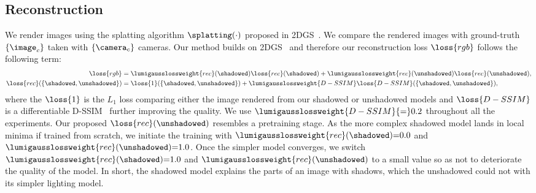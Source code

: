   \subsection{Reconstruction}
    \label{subsec:lumigauss-reconstruction}
    We render images using the splatting algorithm $\splatting(\cdot)$ proposed in
    2DGS~\cite{huang20242d}.
    We compare the rendered images with ground-truth $\{\image_c\}$ taken with
    $\{\camera_c\}$ cameras.
    Our method builds on 2DGS~\cite{huang20242d} and therefore our reconstruction loss $\loss{rgb}$ follows the following term:
    \begin{align}
      \loss{rgb}                             & = \lumigausslossweight{rec}(\shadowed)\loss{rec}(\shadowed) + \lumigausslossweight{rec}(\unshadowed)\loss{rec}(\unshadowed), \\
      \loss{rec}(\{\shadowed, \unshadowed\}) & = \loss{1}(\{\shadowed, \unshadowed\}) + \lumigausslossweight{D-SSIM}\loss{D-SSIM}(\{\shadowed, \unshadowed\}),
    \end{align}
    where the $\loss{1}$ is the $L_1$ loss comparing either the image rendered from our shadowed or unshadowed models and $\loss{D-SSIM}$ is a differentiable D-SSIM~\cite{wang2004image} further improving the quality.
    We use $\lumigausslossweight{D-SSIM}{=}0.2$ throughout all the experiments.
    Our proposed $\loss{rec}(\unshadowed)$ resembles a pretraining stage.
    As the more complex shadowed model lands in local minima if trained from
    scratch, we initiate the training with
    $\lumigausslossweight{rec}(\shadowed){=}0.0$ and
    $\lumigausslossweight{rec}(\unshadowed){=}1.0$.
    Once the simpler model converges, we switch
    $\lumigausslossweight{rec}(\shadowed){=}1.0$ and
    $\lumigausslossweight{rec}(\unshadowed)$ to a small value so as not to
    deteriorate the quality of the model.
    In short, the shadowed model explains the parts of an image with shadows,
    which the unshadowed could not with its simpler lighting model.



